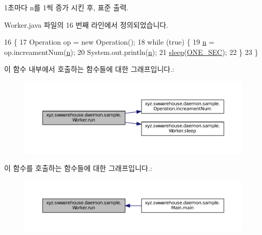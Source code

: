 1초마다 n를 1씩 증가 시킨 후, 표준 출력. 



Worker.\+java 파일의 16 번째 라인에서 정의되었습니다.


\begin{DoxyCode}
16                       \{
17         Operation op = \textcolor{keyword}{new} Operation();
18         \textcolor{keywordflow}{while} (\textcolor{keyword}{true}) \{
19             \hyperlink{classxyz_1_1swwarehouse_1_1daemon_1_1sample_1_1_worker_aba3c26c1febb4e19bfc9562306bcee80}{n} = op.increamentNum(\hyperlink{classxyz_1_1swwarehouse_1_1daemon_1_1sample_1_1_worker_aba3c26c1febb4e19bfc9562306bcee80}{n});
20             System.out.println(\hyperlink{classxyz_1_1swwarehouse_1_1daemon_1_1sample_1_1_worker_aba3c26c1febb4e19bfc9562306bcee80}{n});
21             \hyperlink{classxyz_1_1swwarehouse_1_1daemon_1_1sample_1_1_worker_ae9991783aa9ada529a18ecb5abdb4ad7}{sleep}(\hyperlink{classxyz_1_1swwarehouse_1_1daemon_1_1sample_1_1_worker_a285c9ea5eebf4bb083140ca18048961a}{ONE\_SEC});
22         \}
23     \}
\end{DoxyCode}


이 함수 내부에서 호출하는 함수들에 대한 그래프입니다.\+:
\nopagebreak
\begin{figure}[H]
\begin{center}
\leavevmode
\includegraphics[width=350pt]{classxyz_1_1swwarehouse_1_1daemon_1_1sample_1_1_worker_af1bf199e3277a2946e59c7acc5416731_cgraph}
\end{center}
\end{figure}




이 함수를 호출하는 함수들에 대한 그래프입니다.\+:
\nopagebreak
\begin{figure}[H]
\begin{center}
\leavevmode
\includegraphics[width=350pt]{classxyz_1_1swwarehouse_1_1daemon_1_1sample_1_1_worker_af1bf199e3277a2946e59c7acc5416731_icgraph}
\end{center}
\end{figure}


